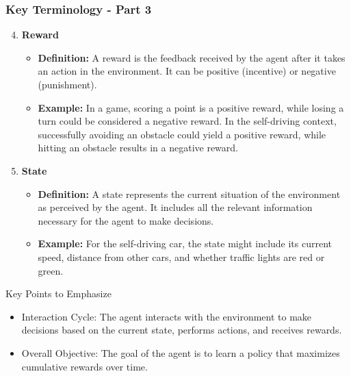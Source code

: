 \documentclass[aspectratio=169]{beamer}
\begin{document}
\begin{frame}[fragile]
    \frametitle{Key Terminology - Part 3}
    \begin{enumerate}
        \setcounter{enumi}{3} %
        \item \textbf{Reward}
            \begin{itemize}
                \item \textbf{Definition:} A reward is the feedback received by the agent after it takes an action in the environment. It can be positive (incentive) or negative (punishment).
                \item \textbf{Example:} In a game, scoring a point is a positive reward, while losing a turn could be considered a negative reward. In the self-driving context, successfully avoiding an obstacle could yield a positive reward, while hitting an obstacle results in a negative reward.
            \end{itemize}
        
        \item \textbf{State}
            \begin{itemize}
                \item \textbf{Definition:} A state represents the current situation of the environment as perceived by the agent. It includes all the relevant information necessary for the agent to make decisions.
                \item \textbf{Example:} For the self-driving car, the state might include its current speed, distance from other cars, and whether traffic lights are red or green.
            \end{itemize}
    \end{enumerate}

    \begin{block}{Key Points to Emphasize}
        \begin{itemize}
            \item Interaction Cycle: The agent interacts with the environment to make decisions based on the current state, performs actions, and receives rewards.
            \item Overall Objective: The goal of the agent is to learn a policy that maximizes cumulative rewards over time.
        \end{itemize}
    \end{block}
\end{frame}
\end{document}
